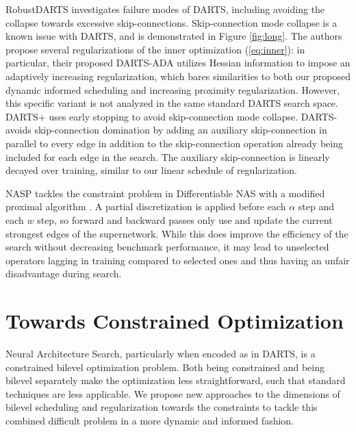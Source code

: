 \documentclass[letterpaper]{article} \usepackage{aaai22}  \usepackage{times}  \usepackage{helvet}  \usepackage{courier}  \usepackage[hyphens]{url}  \usepackage{graphicx} \urlstyle{rm} \def\UrlFont{\rm}  \usepackage{natbib}  \usepackage{caption} \DeclareCaptionStyle{ruled}{labelfont=normalfont,labelsep=colon,strut=off} \frenchspacing  \setlength{\pdfpagewidth}{8.5in}  \setlength{\pdfpageheight}{11in}  \usepackage{algorithm}
\begin{document}
RobustDARTS \cite{zela2020understanding} investigates failure modes of DARTS, including avoiding the collapse towards excessive skip-connections. Skip-connection mode collapse is a known issue with DARTS, and is demonstrated in Figure \ref{fig:long}. The authors propose several regularizations of the inner optimization (\ref{eq:inner}): in particular, their proposed DARTS-ADA utilizes Hessian information to impose an adaptively increasing regularization, which bares similarities to both our proposed dynamic informed scheduling and increasing proximity regularization. However, this specific variant is not analyzed in the same standard DARTS search space. DARTS+ \cite{liang2019darts+} uses early stopping to avoid skip-connection mode collapse. DARTS- \cite{chu2020darts} avoids skip-connection domination by adding an auxiliary skip-connection in parallel to every edge in addition to the skip-connection operation already being included for each edge in the search. The auxiliary skip-connection is linearly decayed over training, similar to our linear schedule of regularization.

NASP \cite{yao2020efficient} tackles the constraint problem in Differentiable NAS with a modified proximal algorithm \cite{parikh2014proximal}. A partial discretization is applied before each $\alpha$ step and each $w$ step, so forward and backward passes only use and update the current strongest edges of the supernetwork. While this does improve the efficiency of the search without decreasing benchmark performance, it may lead to unselected operators lagging in training compared to selected ones and thus having an unfair disadvantage during search. 



\section{Towards Constrained Optimization}
Neural Architecture Search, particularly when encoded as in DARTS, is a constrained bilevel optimization problem. Both being constrained and being bilevel separately make the optimization less straightforward, such that standard techniques are less applicable. We propose new approaches to the dimensions of bilevel scheduling and regularization towards the constraints to tackle this combined difficult problem in a more dynamic and informed fashion.
\end{document}
